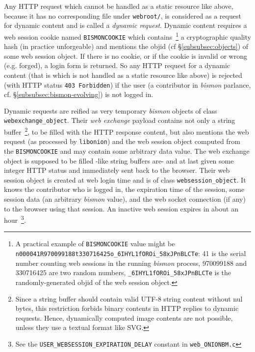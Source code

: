 Any HTTP request which cannot be handled as a static resource like
above, because it has no corresponding file under \texttt{webroot/},
is considered as a request for dynamic content and is called a
  \emph{dynamic
  request}. Dynamic content requires a web session 
 cookie  
named \texttt{BISMONCOOKIE} which contains~\footnote{A practical
  example of \texttt{BISMONCOOKIE} value might be
  \texttt{n000041R970099188t330716425o\_6IHYL1fOROi\_58xJPnBLCTe}: 41
  is the serial number counting web sessions in the running
  \emph{bismon} process, 970099188 and 330716425 are two random
  numbers, \texttt{\_6IHYL1fOROi\_58xJPnBLCTe} is the
  randomly-generated objid of the web session object.} a cryptographic
quality hash (in practice unforgeable) and mentions the objid
 (cf §\ref{subsubsec:objects}) of some web session
object. If there is no cookie, or if the  cookie is
invalid or wrong (e.g. forged), a login  form is
returned. So any HTTP request for a dynamic content (that is which is
not handled as a static resource like above) is rejected (with HTTP
status \texttt{403 Forbidden}) if the user (a 
contributor in \emph{bismon} parlance,
cf. §\ref{subsubsec:bismon-evolving}) is not logged in.

Dynamic requests are reified as very temporary \emph{bismon} objects
of class \texttt{webexchange\_object}. Their \emph{web exchange}
payload contains not only a string buffer~\footnote{Since a string
  buffer should contain valid UTF-8 string content without nul bytes,
  this restriction forbids binary contents in HTTP replies to dynamic
  requests. Hence, dynamically computed image contents are not
  possible, unless they use a textual format like SVG.}, to be filled
with the HTTP response content, but also mentions the web request (as
processed by \texttt{libonion}) and the web session object computed
from the \texttt{BISMONCOOKIE} and may contain some arbitrary data
value. The web exchange object is supposed to be filled -like string
buffers are- and at last given some integer HTTP status and
immediately sent back to the browser.  Their web session object is
created at web login time and is of class
\texttt{websession\_object}. It knows the contributor who is logged
in, the expiration time of the session, some session data (an
arbitrary \emph{bismon} value), and the web socket 
connection (if any) to the browser using that session. An inactive web
session expires in about an hour~\footnote{See the
  \texttt{USER\_WEBSESSION\_EXPIRATION\_DELAY} constant in
  \texttt{web\_ONIONBM.c}}.

